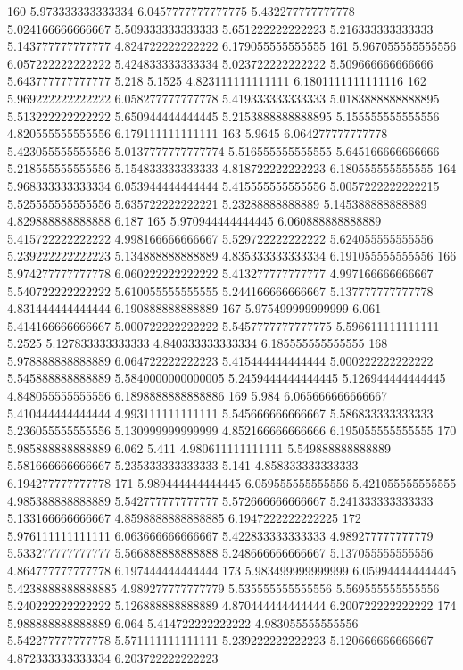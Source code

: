 160 5.973333333333334 6.0457777777777775 5.432277777777778 5.024166666666667 5.509333333333333 5.651222222222223 5.216333333333333 5.143777777777777 4.824722222222222 6.179055555555555
161 5.967055555555556 6.057222222222222 5.424833333333334 5.023722222222222 5.509666666666666 5.643777777777777 5.218 5.1525 4.823111111111111 6.1801111111111116
162 5.969222222222222 6.058277777777778 5.419333333333333 5.0183888888888895 5.513222222222222 5.650944444444445 5.2153888888888895 5.155555555555556 4.820555555555556 6.179111111111111
163 5.9645 6.064277777777778 5.423055555555556 5.0137777777777774 5.516555555555555 5.645166666666666 5.218555555555556 5.154833333333333 4.818722222222223 6.180555555555555
164 5.968333333333334 6.053944444444444 5.415555555555556 5.0057222222222215 5.525555555555556 5.635722222222221 5.23288888888889 5.145388888888889 4.829888888888888 6.187
165 5.970944444444445 6.060888888888889 5.415722222222222 4.998166666666667 5.529722222222222 5.624055555555556 5.239222222222223 5.134888888888889 4.835333333333334 6.191055555555556
166 5.974277777777778 6.060222222222222 5.413277777777777 4.997166666666667 5.540722222222222 5.610055555555555 5.244166666666667 5.137777777777778 4.831444444444444 6.190888888888889
167 5.975499999999999 6.061 5.414166666666667 5.000722222222222 5.5457777777777775 5.596611111111111 5.2525 5.127833333333333 4.840333333333334 6.185555555555555
168 5.978888888888889 6.064722222222223 5.415444444444444 5.000222222222222 5.545888888888889 5.5840000000000005 5.2459444444444445 5.126944444444445 4.848055555555556 6.1898888888888886
169 5.984 6.065666666666667 5.410444444444444 4.993111111111111 5.545666666666667 5.586833333333333 5.236055555555556 5.130999999999999 4.852166666666666 6.195055555555555
170 5.985888888888889 6.062 5.411 4.980611111111111 5.549888888888889 5.581666666666667 5.235333333333333 5.141 4.858333333333333 6.194277777777778
171 5.989444444444445 6.059555555555556 5.421055555555555 4.985388888888889 5.542777777777777 5.572666666666667 5.241333333333333 5.133166666666667 4.8598888888888885 6.1947222222222225
172 5.976111111111111 6.063666666666667 5.422833333333333 4.989277777777779 5.533277777777777 5.566888888888888 5.248666666666667 5.137055555555556 4.864777777777778 6.197444444444444
173 5.983499999999999 6.059944444444445 5.4238888888888885 4.989277777777779 5.535555555555556 5.569555555555556 5.240222222222222 5.126888888888889 4.870444444444444 6.200722222222222
174 5.988888888888889 6.064 5.414722222222222 4.983055555555556 5.542277777777778 5.571111111111111 5.239222222222223 5.120666666666667 4.872333333333334 6.203722222222223
